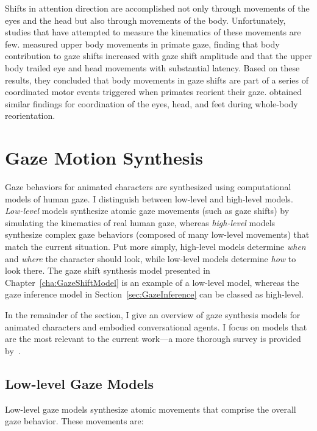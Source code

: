 Shifts in attention direction are accomplished not only through movements of the eyes and the head but also through movements of the body. Unfortunately, studies that have attempted to measure the kinematics of these movements are few. \citet{mccluskey2007monkeys} measured upper body movements in primate gaze, finding that body contribution to gaze shifts increased with gaze shift amplitude and that the upper body trailed eye and head movements with substantial latency. Based on these results, they concluded that body movements in gaze shifts are part of a series of coordinated motor events triggered when primates reorient their gaze. \citet{hollands2004wholebody} obtained similar findings for coordination of the eyes, head, and feet during whole-body reorientation.

\section{Gaze Motion Synthesis}

Gaze behaviors for animated characters are synthesized using computational models of human gaze. I distinguish between low-level and high-level models. \emph{Low-level} models synthesize atomic gaze movements (such as gaze shifts) by simulating the kinematics of real human gaze, whereas \emph{high-level} models synthesize complex gaze behaviors (composed of many low-level movements) that match the current situation. Put more simply, high-level models determine \emph{when} and \emph{where} the character should look, while low-level models determine \emph{how} to look there. The gaze shift synthesis model presented in Chapter~\ref{cha:GazeShiftModel} is an example of a low-level model, whereas the gaze inference model in Section~\ref{sec:GazeInference} can be classed as high-level.

In the remainder of the section, I give an overview of gaze synthesis models for animated characters and embodied conversational agents. I focus on models that are the most relevant to the current work---a more thorough survey is provided by~\citet{ruhland2015gazereview}.

\subsection{Low-level Gaze Models}

Low-level gaze models synthesize atomic movements that comprise the overall gaze behavior. These movements are:

